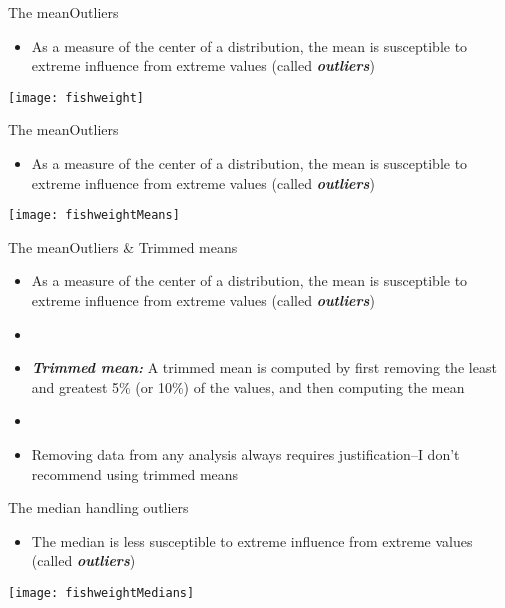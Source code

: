 \documentclass[xcolor=dvipsnames]{beamer}
\begin{document}
\begin{frame}{The mean}{Outliers}
\begin{itemize}
	\item As a measure of the center of a distribution, the mean is susceptible to extreme influence from extreme values (called \textbf{\emph{outliers}})
\end{itemize}
\begin{center}
	\texttt{[image: fishweight]}
\end{center}
\end{frame}

\begin{frame}{The mean}{Outliers}
\begin{itemize}
	\item As a measure of the center of a distribution, the mean is susceptible to extreme influence from extreme values (called \textbf{\emph{outliers}})
\end{itemize}
\begin{center}
	\texttt{[image: fishweightMeans]}
\end{center}
\end{frame}

\begin{frame}{The mean}{Outliers \& Trimmed means}
\begin{itemize}
	\item As a measure of the center of a distribution, the mean is susceptible to extreme influence from extreme values (called \textbf{\emph{outliers}})
	\item[]
	\item \textbf{\emph{Trimmed mean:}} A trimmed mean is computed by first removing the least and greatest 5\% (or 10\%) of the values, and then computing the mean \pause
	\item[]
	\item Removing data from any analysis always requires justification--I don't recommend using trimmed means
\end{itemize}
\end{frame}

\begin{frame}{The median handling outliers}
\begin{itemize}
	\item The median is less susceptible to extreme influence from extreme values (called \textbf{\emph{outliers}})
\end{itemize}
\begin{center}
	\texttt{[image: fishweightMedians]}
\end{center}
\end{frame}
\end{document}

